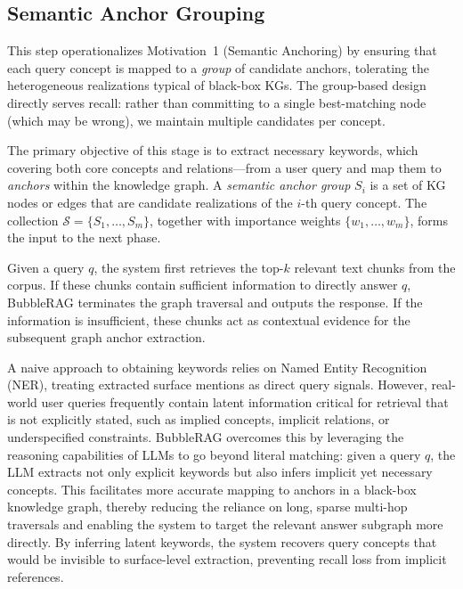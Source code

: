 \subsection{Semantic Anchor Grouping}\label{sec:anchor-group}


This step operationalizes Motivation~1 (Semantic Anchoring) by ensuring that each query concept is mapped to a \emph{group} of candidate anchors, tolerating the heterogeneous realizations typical of black-box KGs. The group-based design directly serves recall: rather than committing to a single best-matching node (which may be wrong), we maintain multiple candidates per concept.

The primary objective of this stage is to extract necessary keywords, which covering both core concepts and relations---from a user query and map them to \emph{anchors} within the knowledge graph. A \emph{semantic anchor group} $S_i$ is a set of KG nodes or edges that are candidate realizations of the $i$-th query concept. The collection $\mathcal{S} = \{S_1, \ldots, S_m\}$, together with importance weights $\{w_1, \ldots, w_m\}$, forms the input to the next phase.

Given a query $q$, the system first retrieves the top-$k$ relevant text chunks from the corpus. If these chunks contain sufficient information to directly answer $q$, BubbleRAG terminates the graph traversal and outputs the response. If the information is insufficient, these chunks act as contextual evidence for the subsequent graph anchor extraction.


A naive approach to obtaining keywords relies on Named Entity Recognition (NER), treating extracted surface mentions as direct query signals. However, real-world user queries frequently contain latent information critical for retrieval that is not explicitly stated, such as implied concepts, implicit relations, or underspecified constraints. BubbleRAG overcomes this by leveraging the reasoning capabilities of LLMs to go beyond literal matching: given a query $q$, the LLM extracts not only explicit keywords but also infers implicit yet necessary concepts. This facilitates more accurate mapping to anchors in a black-box knowledge graph, thereby reducing the reliance on long, sparse multi-hop traversals and enabling the system to target the relevant answer subgraph more directly. By inferring latent keywords, the system recovers query concepts that would be invisible to surface-level extraction, preventing recall loss from implicit references.


